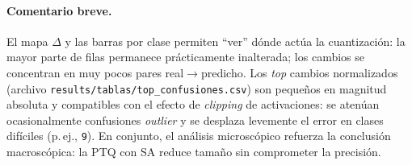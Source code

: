 \paragraph{Comentario breve.}
El mapa $\Delta$ y las barras por clase permiten “ver” dónde actúa la cuantización: la mayor parte de filas permanece prácticamente inalterada; los cambios se concentran en muy pocos pares real$\rightarrow$predicho. Los \emph{top} cambios normalizados (archivo \texttt{results/tablas/top\_confusiones.csv}) son pequeños en magnitud absoluta y compatibles con el efecto de \emph{clipping} de activaciones: se atenúan ocasionalmente confusiones \emph{outlier} y se desplaza levemente el error en clases difíciles (p.\,ej., \texttt{9}). En conjunto, el análisis microscópico refuerza la conclusión macroscópica: la PTQ con SA reduce tamaño sin comprometer la precisión.
